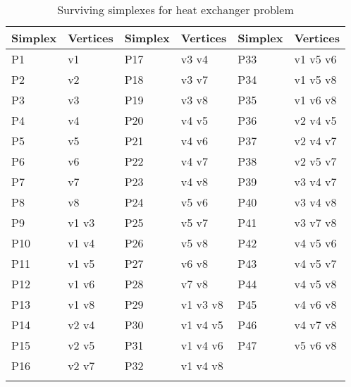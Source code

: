 \begin{table}[!ht]\scriptsize
	\centering
	\caption{Surviving {\color{blue}simplexes} for heat exchanger problem}
	\label{tab:probstatheat2}
	\tabcolsep=0.11cm
	\begin{tabular}{llllll}
		\specialrule{.1em}{.1em}{.1em} 
		{\bf {\color{blue}Simplex}} & {\bf Vertices} & {\bf {\color{blue}Simplex}} & {\bf Vertices} & {\bf {\color{blue}Simplex}} & {\bf Vertices} \\ \hline
		P1             & v1             & P17            & v3 v4          & P33            & v1 v5 v6       \\ \hline
		P2             & v2             & P18            & v3 v7          & P34            & v1 v5 v8       \\ \hline
		P3             & v3             & P19            & v3 v8          & P35            & v1 v6 v8       \\ \hline
		P4             & v4             & P20            & v4 v5          & P36            & v2 v4 v5       \\ \hline
		P5             & v5             & P21            & v4 v6          & P37            & v2 v4 v7       \\ \hline
		P6             & v6             & P22            & v4 v7          & P38            & v2 v5 v7       \\ \hline
		P7             & v7             & P23            & v4 v8          & P39            & v3 v4 v7       \\ \hline
		P8             & v8             & P24            & v5 v6          & P40            & v3 v4 v8       \\ \hline
		P9             & v1 v3          & P25            & v5 v7          & P41            & v3 v7 v8       \\ \hline
		P10            & v1 v4          & P26            & v5 v8          & P42            & v4 v5 v6       \\ \hline
		P11            & v1 v5          & P27            & v6 v8          & P43            & v4 v5 v7       \\ \hline
		P12            & v1 v6          & P28            & v7 v8          & P44            & v4 v5 v8       \\ \hline
		P13            & v1 v8          & P29            & v1 v3 v8       & P45            & v4 v6 v8       \\ \hline
		P14            & v2 v4          & P30            & v1 v4 v5       & P46            & v4 v7 v8       \\ \hline
		P15            & v2 v5          & P31            & v1 v4 v6       & P47            & v5 v6 v8       \\ \hline
		P16            & v2 v7          & P32            & v1 v4 v8       &                &                \\ \specialrule{.1em}{.1em}{.1em}
	\end{tabular}
\end{table}

